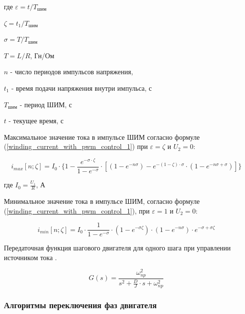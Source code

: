 где $\varepsilon = t / T_\textit{шим}$

$\zeta = t_{1} / T_\textit{шим}$

$\sigma = T / T_\textit{шим}$

$T = L / R$, Гн/Ом

$n$ - число периодов импульсов напряжения,

$t_{1}$ - время подачи напряжения внутри импульса, с

$T_\textit{шим}$ - период ШИМ, с

$t$ - текущее время, с

Максимальное значение тока в импульсе ШИМ согласно формуле
(\ref{winding_current_with_pwm_control_1}) при
$\varepsilon = \zeta$ и $U_{2} = 0$:

\begin{equation}
    \label{max_current_in_the_n_pwm_pulse}
    i_{max}[n; \zeta] =
        I_{0}
            \cdot \{ 1
                     - \frac{ e^{-\sigma \cdot \zeta} }{ 1 - e^{-\sigma} }
                       \cdot [ (1 - e^{-n\sigma})
                               - e^{ -(1 - \zeta) \cdot \sigma }
                                    \cdot ( 1 - e^{-n\sigma + \sigma} )
                             ]
                  \}
\end{equation}

где $I_{0} = \frac{ U_{1} }{ R }$, А

Минимальное значение тока в импульсе ШИМ, согласно формуле
(\ref{winding_current_with_pwm_control_1}), при
$\varepsilon = 1$ и $U_{2} = 0$:

\begin{equation}
    \label{min_current_in_the_n_pwm_pulse}
    i_{min}[n; \zeta] =
        I_{0}
            \cdot \frac{ 1 }{ 1-e^{-\sigma} }
            \cdot (1 - e^{-\sigma\zeta})
            \cdot (1 - e^{-n\sigma})
            \cdot e^{-\sigma + \sigma\zeta}
\end{equation}

Передаточная функция шагового двигателя для одного шага при управлении источником
тока \cite[гл. 4.2, ф-ла 4.65]{Kenio}.

\begin{equation}
    \label{step_motor_transfer_function}
    G(s) = \frac{ \omega_{np}^{2} }
                { s^{2} + \frac{D}{J} \cdot s + \omega_{np}^{2} }
\end{equation}

\newpage
\subsubsection{Алгоритмы переключения фаз двигателя}
\label{sec_step_control_algos}


